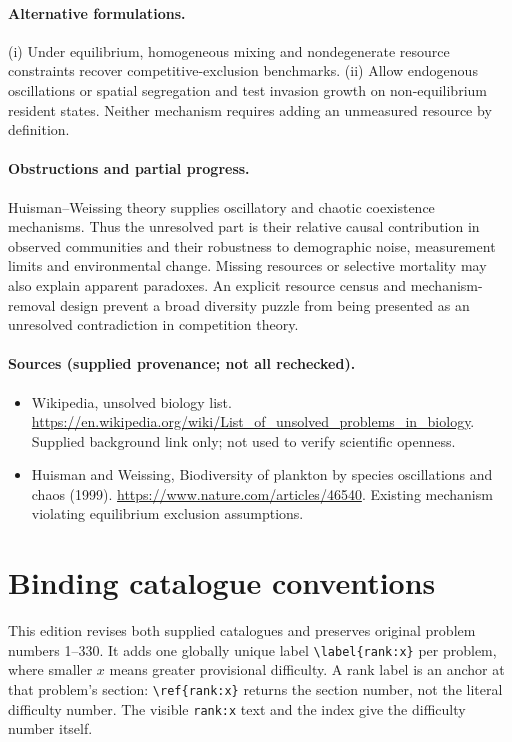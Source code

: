 \documentclass[11pt]{article}
\begin{document}
\paragraph{Alternative formulations.} (i) Under equilibrium, homogeneous mixing and nondegenerate resource constraints recover competitive-exclusion benchmarks. (ii) Allow endogenous oscillations or spatial segregation and test invasion growth on non-equilibrium resident states. Neither mechanism requires adding an unmeasured resource by definition.
\paragraph{Obstructions and partial progress.} Huisman--Weissing theory supplies oscillatory and chaotic coexistence mechanisms. Thus the unresolved part is their relative causal contribution in observed communities and their robustness to demographic noise, measurement limits and environmental change. Missing resources or selective mortality may also explain apparent paradoxes. An explicit resource census and mechanism-removal design prevent a broad diversity puzzle from being presented as an unresolved contradiction in competition theory.
\paragraph{Sources (supplied provenance; not all rechecked).}
\begin{itemize}
\item Wikipedia, unsolved biology list. \url{https://en.wikipedia.org/wiki/List_of_unsolved_problems_in_biology}. Supplied background link only; not used to verify scientific openness.
\item Huisman and Weissing, Biodiversity of plankton by species oscillations and chaos (1999). \url{https://www.nature.com/articles/46540}. Existing mechanism violating equilibrium exclusion assumptions.
\end{itemize}


\section*{Binding catalogue conventions}
This edition revises both supplied catalogues and preserves original problem numbers 1--330. It adds one globally unique label \verb|\label{rank:x}| per problem, where smaller $x$ means greater provisional difficulty. A rank label is an anchor at that problem's section: \verb|\ref{rank:x}| returns the section number, not the literal difficulty number. The visible \texttt{rank:x} text and the index give the difficulty number itself.
\end{document}
